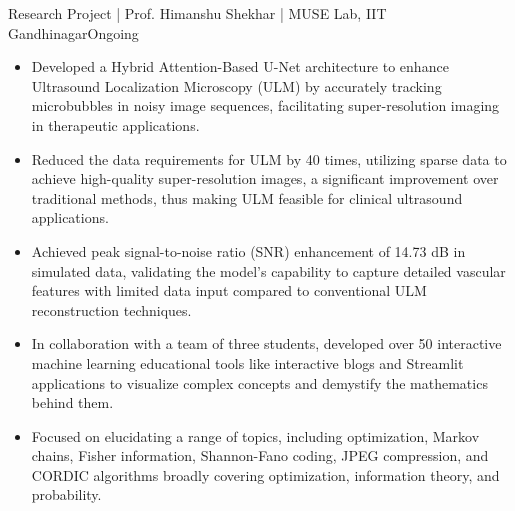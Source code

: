 \documentclass[a4paper,11pt]{cdsTemp}
\begin{document}
{Research Project | Prof. Himanshu Shekhar | MUSE Lab, IIT Gandhinagar}{Ongoing}{}
\begin{itemize}
    \item Developed a Hybrid Attention-Based U-Net architecture to enhance Ultrasound Localization Microscopy (ULM) by accurately tracking microbubbles in noisy image sequences, facilitating super-resolution imaging in therapeutic applications.
    \item Reduced the data requirements for ULM by 40 times, utilizing sparse data to achieve high-quality super-resolution images, a significant improvement over traditional methods, thus making ULM feasible for clinical ultrasound applications.
    \item Achieved peak signal-to-noise ratio (SNR) enhancement of 14.73 dB in simulated data, validating the model's capability to capture detailed vascular features with limited data input compared to conventional ULM reconstruction techniques.
\end{itemize}
\divider


\begin{itemize}
    \item In collaboration with a team of three students, developed over 50 interactive machine learning educational tools like interactive blogs and Streamlit applications to visualize complex concepts and demystify the mathematics behind them.
    \item Focused on elucidating a range of topics, including optimization, Markov chains, Fisher information, Shannon-Fano coding, JPEG compression, and CORDIC algorithms broadly covering optimization, information theory, and probability.
\end{itemize}
\divider
\end{document}
